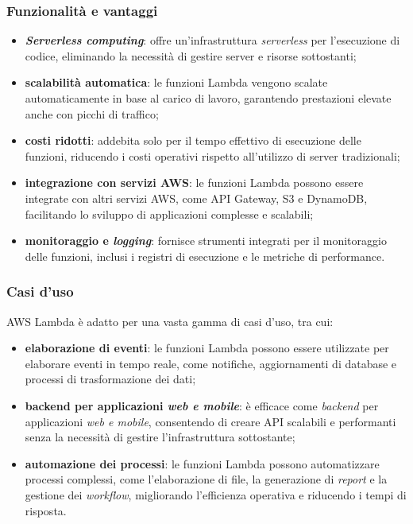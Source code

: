 \subsubsection{Funzionalità e vantaggi}
\begin{itemize}
    \item \textbf{\textit{Serverless computing}}: offre un’infrastruttura \textit{serverless} per l’esecuzione di codice, eliminando la necessità di gestire server e risorse sottostanti;
    \item \textbf{scalabilità automatica}: le funzioni Lambda vengono scalate automaticamente in base al carico di lavoro, garantendo prestazioni elevate anche con picchi di traffico;
    \item \textbf{costi ridotti}: addebita solo per il tempo effettivo di esecuzione delle funzioni, riducendo i costi operativi rispetto all’utilizzo di server tradizionali;
    \item \textbf{integrazione con servizi AWS}: le funzioni Lambda possono essere integrate con altri servizi AWS, come API Gateway, S3 e DynamoDB, facilitando lo sviluppo di applicazioni complesse e scalabili;
    \item \textbf{monitoraggio e \textit{logging}}: fornisce strumenti integrati per il monitoraggio delle funzioni, inclusi i registri di esecuzione e le metriche di performance.
\end{itemize}


\subsubsection{Casi d'uso}
AWS Lambda è adatto per una vasta gamma di casi d’uso, tra cui:
\begin{itemize}
    \item \textbf{elaborazione di eventi}: le funzioni Lambda possono essere utilizzate per elaborare eventi in tempo reale, come notifiche, aggiornamenti di database e processi di trasformazione dei dati;
    \item \textbf{backend per applicazioni \textit{web e mobile}}: è efficace come \textit{backend} per applicazioni \textit{web e mobile}, consentendo di creare API scalabili e performanti senza la necessità di gestire l’infrastruttura sottostante;
    \item \textbf{automazione dei processi}: le funzioni Lambda possono automatizzare processi complessi, come l’elaborazione di file, la generazione di \textit{report} e la gestione dei \textit{workflow}, migliorando l’efficienza operativa e riducendo i tempi di risposta.
\end{itemize}

